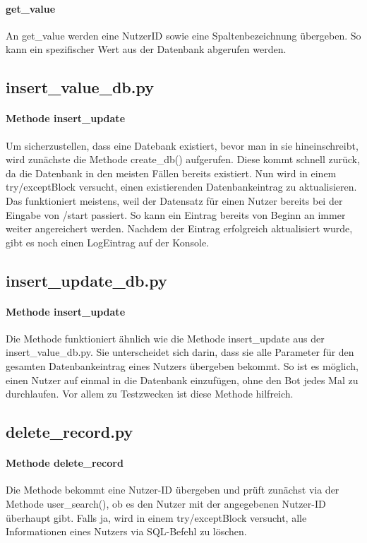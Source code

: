             \paragraph{get\_value}
                An get\_value werden eine Nutzer\-ID sowie eine Spaltenbezeichnung übergeben. So kann ein spezifischer Wert aus der Datenbank abgerufen werden. 

        \subsection{insert\_value\_db.py}
            \paragraph{Methode insert\_update}
                Um sicherzustellen, dass eine Datebank existiert, bevor man in sie hineinschreibt, wird zunächste die Methode create\_db() aufgerufen. Diese kommt schnell zurück, da die Datenbank in den meisten Fällen bereits existiert. Nun wird in einem try/except\-Block versucht, einen existierenden Datenbankeintrag zu aktualisieren. Das funktioniert meistens, weil der Datensatz für einen Nutzer bereits bei der Eingabe von /start passiert. So kann ein Eintrag bereits von Beginn an immer weiter angereichert werden. Nachdem der Eintrag erfolgreich aktualisiert wurde, gibt es noch einen Log\-Eintrag auf der Konsole.  
        
        \subsection{insert\_update\_db.py}
            \paragraph{Methode insert\_update}
                Die Methode funktioniert ähnlich wie die Methode insert\_update aus der insert\_value\_db.py. Sie unterscheidet sich darin, dass sie alle Parameter für den gesamten Datenbankeintrag eines Nutzers übergeben bekommt. So ist es möglich, einen Nutzer auf einmal in die Datenbank einzufügen, ohne den Bot jedes Mal zu durchlaufen. Vor allem zu Testzwecken ist diese Methode hilfreich.
        
        \subsection{delete\_record.py}
            \paragraph{Methode delete\_record}
                Die Methode bekommt eine Nutzer-ID übergeben und prüft zunächst via der Methode user\_search(), ob es den Nutzer mit der angegebenen Nutzer-ID überhaupt gibt. Falls ja, wird in einem try/except\-Block versucht, alle Informationen eines Nutzers via SQL-Befehl zu löschen. 


